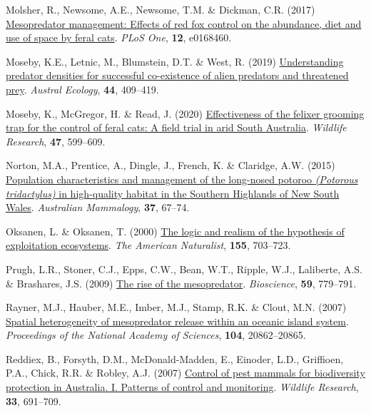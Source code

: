 \documentclass[preprint, 3p, authoryear]{elsarticle} %
\newlength{\cslhangindent}
\newlength{\cslentryspacingunit} %
\newenvironment{CSLReferences}[2] %
 {%
  \setlength{\parindent}{0pt}
  \ifodd #1
  \let\oldpar\par
  \def\par{\hangindent=\cslhangindent\oldpar}
  \fi
  \setlength{\parskip}{#2\cslentryspacingunit}
 }%
 {}
\begin{document}
\begin{CSLReferences}{1}{0}
\leavevmode{}%
Molsher, R., Newsome, A.E., Newsome, T.M. \& Dickman, C.R. (2017) \href{https://doi.org/10.1371/journal.pone.0168460}{Mesopredator management: Effects of red fox control on the abundance, diet and use of space by feral cats}. \emph{PLoS One}, \textbf{12}, e0168460.

\leavevmode{}%
Moseby, K.E., Letnic, M., Blumstein, D.T. \& West, R. (2019) \href{https://doi.org/10.1111/aec.12697}{Understanding predator densities for successful co-existence of alien predators and threatened prey}. \emph{Austral Ecology}, \textbf{44}, 409--419.

\leavevmode{}%
Moseby, K., McGregor, H. \& Read, J. (2020) \href{https://doi.org/10.1071/WR19132}{Effectiveness of the felixer grooming trap for the control of feral cats: A field trial in arid {South {A}ustralia}}. \emph{Wildlife Research}, \textbf{47}, 599--609.

\leavevmode{}%
Norton, M.A., Prentice, A., Dingle, J., French, K. \& Claridge, A.W. (2015) \href{https://doi.org/10.1071/AM14026}{Population characteristics and management of the long-nosed potoroo \emph{({Potorous tridactylus})} in high-quality habitat in the {Southern Highlands of New South Wales}}. \emph{Australian Mammalogy}, \textbf{37}, 67--74.

\leavevmode{}%
Oksanen, L. \& Oksanen, T. (2000) \href{https://doi.org/10.1086/303354}{The logic and realism of the hypothesis of exploitation ecosystems}. \emph{The American Naturalist}, \textbf{155}, 703--723.

\leavevmode{}%
Prugh, L.R., Stoner, C.J., Epps, C.W., Bean, W.T., Ripple, W.J., Laliberte, A.S. \& Brashares, J.S. (2009) \href{https://doi.org/10.1525/bio.2009.59.9.9}{The rise of the mesopredator}. \emph{Bioscience}, \textbf{59}, 779--791.

\leavevmode{}%
Rayner, M.J., Hauber, M.E., Imber, M.J., Stamp, R.K. \& Clout, M.N. (2007) \href{https://doi.org/10.1073/pnas.0707414105}{Spatial heterogeneity of mesopredator release within an oceanic island system}. \emph{Proceedings of the National Academy of Sciences}, \textbf{104}, 20862--20865.

\leavevmode{}%
Reddiex, B., Forsyth, D.M., McDonald-Madden, E., Einoder, L.D., Griffioen, P.A., Chick, R.R. \& Robley, A.J. (2007) \href{https://doi.org/10.1071/WR05102}{Control of pest mammals for biodiversity protection in {{A}ustralia}. I. Patterns of control and monitoring}. \emph{Wildlife Research}, \textbf{33}, 691--709.


\end{CSLReferences}
\end{document}
